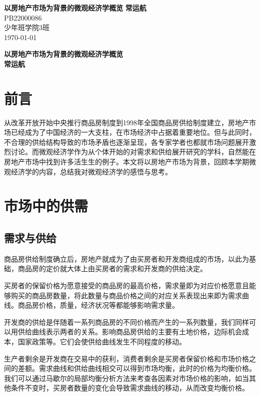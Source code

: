 \documentclass{ctexart}
\begin{document}
\begin{titlepage}
   \begin{center}
    \vspace*{1cm}
    \Huge
    \textbf{以房地产市场为背景的微观经济学概览}
    \vspace{0.3cm}
    \vfill
    \huge
    \textbf{常运航}\\
    \vspace{0.8cm}
    \vspace{1.5cm}
    \LARGE      
    PB22000086\\
    少年班学院3班\\
    \today\\
   \end{center}
\end{titlepage}
\pagestyle{empty}
\begin{center}
    \huge
    \textbf{以房地产市场为背景的微观经济学概览}
    \\
    \vspace{0.4cm}
    \LARGE
    \vspace{0.4cm}
    \textbf{常运航}
\end{center}

\vspace{1.5cm}
\section{前言}
从改革开放开始中央推行商品房制度到1998年全国商品房供给制度建立，房地产市场已经成为了中国经济的一大支柱，在市场经济中占据着重要地位。但与此同时，不合理的供给结构导致的市场矛盾也逐渐呈现，各专家学者也都就市场问题展开激烈讨论。而微观经济学作为从个体开始的对需求和供给展开研究的学科，自然能在房地产市场中找到许多活生生的例子。本文将以房地产市场为背景，回顾本学期微观经济学的内容，总结我对微观经济学的感悟与思考。

\section{市场中的供需}
\subsection{需求与供给}
商品房供给制度确立后，房地产就成为了由买房者和开发商组成的市场，以此为基础，商品房的定价就大体上由买房者的需求和开发商的供给决定。
\par
买房者的保留价格为愿意接受的商品房的最高价格，需求量即为对应价格愿意且能够购买的商品房数量，将此数量与商品价格之间的对应关系表现出来即为需求曲线。商品房价格，质量，经济状况等都能够影响需求量。
\par
开发商的供给是伴随着一系列商品房的不同价格而产生的一系列数量，我们同样可以用供给曲线表示两者的关系。影响商品房供给的主要有土地价格，边际机会成本，国家政策等。它们会使供给曲线发生不同程度的移动。
\par
生产者剩余是开发商在交易中的获利，消费者剩余是买房者保留价格和市场价格之间的差额。需求曲线和供给曲线相交可以得到市场均衡，此时的价格为均衡价格。我们可以通过马歇尔的局部均衡分析方法来考查各因素对市场价格的影响，如当其他条件不变时，买房者数量的变化会导致需求曲线的移动，从而改变均衡价格。
\end{document}
